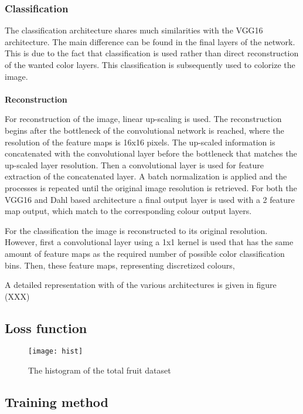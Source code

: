 {\subsubsection{Classification}
The classification architecture shares much similarities with the VGG16 architecture. The main difference can be found in the final layers of the network. This is due to the fact that classification is used rather than direct reconstruction of the wanted color layers. This classification is subsequently used to colorize the image. \\
\\
\textbf{Reconstruction}

For reconstruction of the image, linear up-scaling is used. The reconstruction begins after the bottleneck of the convolutional network is reached, where the resolution of the feature maps is 16x16 pixels. The up-scaled information is concatenated with the convolutional layer before the bottleneck that matches the up-scaled layer resolution. Then a convolutional layer is used for feature extraction of the concatenated layer. A batch normalization is applied and the processes is repeated until the original image resolution is retrieved. For both the VGG16 and Dahl based architecture a final output layer is used with a 2 feature map output, which match to the corresponding colour output layers.

For the classification the image is reconstructed to its original resolution. However, first a convolutional layer using a 1x1 kernel is used that has the same amount of feature maps as the required number of possible color classification bins. Then, these feature maps, representing discretized colours, %


A detailed representation with of the various architectures is given in figure {\color{red}(XXX)}}

\subsection{Loss function}

\begin{wrapfigure}{r}{0.5\textwidth}
	\vspace{-20pt}
	\begin{center}
		\texttt{[image: hist]}
	\end{center}
	\caption{\color{red} The histogram of the total fruit dataset}
	\vspace{-10pt}
\end{wrapfigure}

\subsection{Training method}


